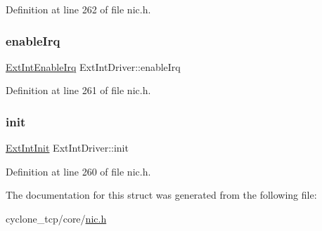 Definition at line 262 of file nic.\+h.

\mbox{\label{structExtIntDriver_a32c52bdf0311e63967fb7b5eb8dc6c3c}} 
\subsubsection{\texorpdfstring{enable\+Irq}{enableIrq}}
{\footnotesize\ttfamily \hyperlink{nic_8h_a7718a8a56f19fcb851736f1810e2efce}{Ext\+Int\+Enable\+Irq} Ext\+Int\+Driver\+::enable\+Irq}



Definition at line 261 of file nic.\+h.

\mbox{\label{structExtIntDriver_a25a77659646a73f8f4f46db4acde5931}} 
\subsubsection{\texorpdfstring{init}{init}}
{\footnotesize\ttfamily \hyperlink{nic_8h_a0fb3a794e644738e423bbcf3fc09047b}{Ext\+Int\+Init} Ext\+Int\+Driver\+::init}



Definition at line 260 of file nic.\+h.



The documentation for this struct was generated from the following file\+:\begin{DoxyCompactItemize}
\item 
cyclone\+\_\+tcp/core/\hyperlink{nic_8h}{nic.\+h}\end{DoxyCompactItemize}
